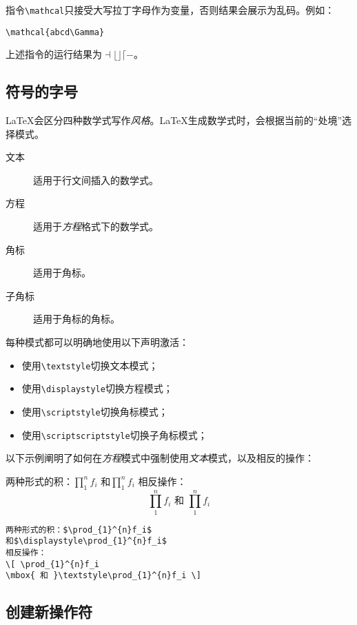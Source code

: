 \begin{exclamation}
指令\verb|\mathcal|只接受大写拉丁字母作为变量，否则结果会展示为乱码。例如：

\begin{dmd}
\verb|\mathcal{abcd\Gamma}|
\end{dmd}

上述指令的运行结果为$\dashv \lfloor \rfloor \lceil -$。
\end{exclamation}

\subsection{符号的字号}

\LaTeX 会区分四种数学式写作\emph{风格}。\LaTeX 生成数学式时，会根据当前的“处境”选择模式。

\begin{description}
  \item[文本] 适用于行文间插入的数学式。
  \item[方程] 适用于\emph{方程}格式下的数学式。
  \item[角标] 适用于角标。
  \item[子角标] 适用于角标的角标。 
\end{description}

每种模式都可以明确地使用以下声明激活：

\begin{itemize}
  \item 使用\verb|\textstyle|切换文本模式；
  \item 使用\verb|\displaystyle|切换方程模式；
  \item 使用\verb|\scriptstyle|切换角标模式；
  \item 使用\verb|\scriptscriptstyle|切换子角标模式；
\end{itemize}

以下示例阐明了如何在\emph{方程}模式中强制使用\emph{文本}模式，以及相反的操作：

\begin{codelist}[3.24]{
两种形式的积：$\prod_{1}^{n}f_i$
和$\displaystyle\prod_{1}^{n}f_i$
相反操作：
\[ \prod_{1}^{n}f_i
\mbox{ 和 }\textstyle\prod_{1}^{n}f_i \]
}\begin{verbatim}
两种形式的积：$\prod_{1}^{n}f_i$
和$\displaystyle\prod_{1}^{n}f_i$
相反操作：
\[ \prod_{1}^{n}f_i
\mbox{ 和 }\textstyle\prod_{1}^{n}f_i \]
\end{verbatim}
\end{codelist}

\subsection{创建新操作符}

